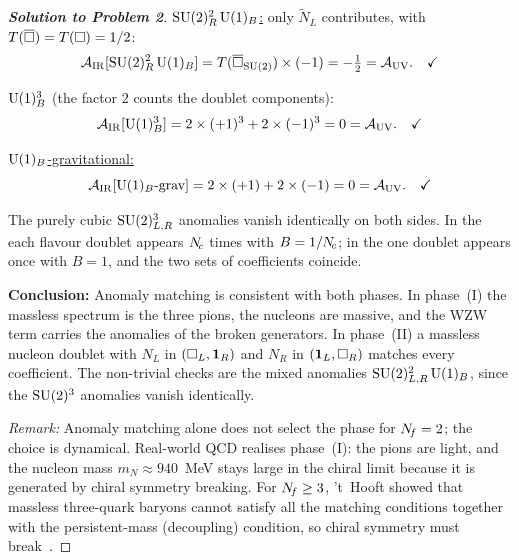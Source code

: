 \documentclass[11pt,a4paper]{article}
\begin{document}
\begin{proof}[\textbf{Solution to Problem 2}]
\underline{$\mathrm{SU}(2)_R^2\,\mathrm{U}(1)_B$:} only $\widetilde{N}_L$ contributes,
with $T(\overline{\square}) = T(\square) = 1/2$:
\begin{equation}
  \mathcal{A}_{\mathrm{IR}}[\mathrm{SU}(2)_R^2\,\mathrm{U}(1)_B]
  = T(\overline{\square}_{\mathrm{SU}(2)}) \times (-1)
  = -\tfrac{1}{2}
  = \mathcal{A}_{\mathrm{UV}}. \quad\checkmark
\end{equation}

\underline{$\mathrm{U}(1)_B^3$} (the factor $2$ counts the doublet components):
\begin{equation}
  \mathcal{A}_{\mathrm{IR}}[\mathrm{U}(1)_B^3]
  = 2 \times (+1)^3 + 2 \times (-1)^3
  = 0
  = \mathcal{A}_{\mathrm{UV}}. \quad\checkmark
\end{equation}

\underline{$\mathrm{U}(1)_B$-gravitational:}
\begin{equation}
  \mathcal{A}_{\mathrm{IR}}[\mathrm{U}(1)_B\text{-grav}]
  = 2 \times (+1) + 2 \times (-1)
  = 0
  = \mathcal{A}_{\mathrm{UV}}. \quad\checkmark
\end{equation}

The purely cubic $\mathrm{SU}(2)_{L,R}^3$ anomalies vanish identically on both
sides.  In the \UV{} each flavour doublet appears $N_{\!c}$ times with
$B = 1/N_{\!c}$; in the \IR{} one doublet appears once with $B = 1$, and the
two sets of coefficients coincide.

\bigskip

\textbf{Conclusion:} Anomaly matching is consistent with both phases.
In phase~(I) the massless spectrum is the three pions, the nucleons are
massive, and the WZW term carries the anomalies of the broken
generators.  In phase~(II) a massless nucleon doublet with $N_L$ in
$(\square_L, \mathbf{1}_R)$ and $N_R$ in $(\mathbf{1}_L, \square_R)$
matches every coefficient.  The non-trivial checks are the mixed
anomalies $\mathrm{SU}(2)_{L,R}^2\,\mathrm{U}(1)_B$, since the $\mathrm{SU}(2)^3$ anomalies
vanish identically.

\textit{Remark:} Anomaly matching alone does not select the phase for
$N_{\!f} = 2$; the choice is dynamical.  Real-world QCD realises phase~(I):
the pions are light, and the nucleon mass $m_N \approx 940$~MeV stays
large in the chiral limit because it is generated by chiral symmetry
breaking.  For $N_{\!f} \geq 3$, 't~Hooft showed that massless three-quark
baryons cannot satisfy all the matching conditions together with the
persistent-mass (decoupling) condition, so chiral symmetry must
break~\cite{tHooft1980}.
\end{proof}

\newpage

\end{document}
